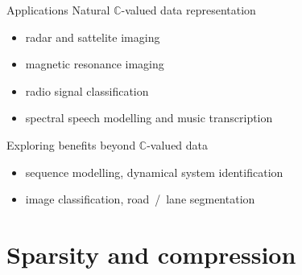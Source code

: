 \documentclass{beamer}
\newcommand{\cplx}{\mathbb{C}}
\begin{document}
\begin{frame}[c]{Applications}{\insertsection}
  Natural $\cplx$-valued data representation
  \begin{itemize}
    \smallskip
    \item radar and sattelite imaging
      \citep{hirose_complex-valued_2009,hansch_complex-valued_2010,zhang_complex-valued_2017}
    \smallskip
    \item magnetic resonance imaging
      \citep{hui_mri_1995,wang_deepcomplexmri_2020}
    \smallskip
    \item radio signal classification \citep{yang_complex_2019,tarver_design_2019}
    \smallskip
    \item spectral speech modelling and music transcription
      \citep{wisdom_full-capacity_2016,trabelsi_deep_2018,yang_complex_2019}
  \end{itemize}
  \bigskip
  Exploring benefits beyond $\cplx$-valued data
  \begin{itemize}
    \item sequence modelling, dynamical system identification
      \citep{danihelka_associative_2016,wisdom_full-capacity_2016}
    \smallskip
    \item image classification, road~/~lane segmentation  %
      \citep{popa_complex-valued_2017,trabelsi_deep_2018,gaudet_deep_2018}
  \end{itemize}
\end{frame}


\section{Sparsity and compression} %
\label{sec:compression}
\end{document}
